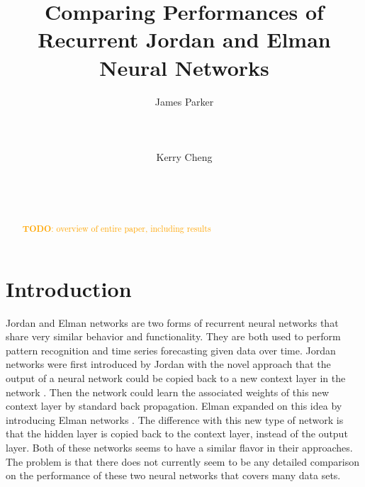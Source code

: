 \documentclass{acm_proc_article-sp}
\newcommand{\todo}[1]{\textcolor{orange}{\textbf{TODO}: #1}} %
\begin{document}
\title{Comparing Performances of Recurrent Jordan and Elman Neural Networks}
\author{
\alignauthor James Parker\\%
       \\
       \\
       \\
\alignauthor Kerry Cheng\\%
       \\
       \\
       \\
}

\maketitle

\begin{abstract}
\todo{overview of entire paper, including results}
\end{abstract}
\section{Introduction} %
Jordan and Elman networks are two forms of recurrent neural networks that share very similar behavior and functionality. 
They are both used to perform pattern recognition and time series forecasting given data over time. 
Jordan networks were first introduced by Jordan with the novel approach that the output of a neural network could be copied back to a new context layer in the network \cite{jordan}. Then the network could learn the associated weights of this new context layer by standard back propagation. 
Elman expanded on this idea by introducing Elman networks \cite{elman}. 
The difference with this new type of network is that the hidden layer is copied back to the context layer, instead of the output layer. 
Both of these networks seems to have a similar flavor in their approaches.
The problem is that there does not currently seem to be any detailed comparison on the performance of these two neural networks that covers many data sets. 
\end{document}
